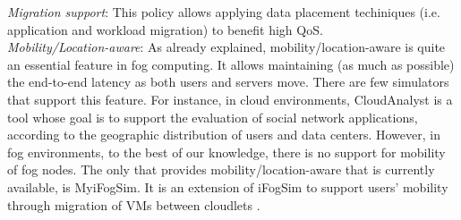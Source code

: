 \noindent\tab \textit{Migration support}: This policy allows applying data placement techiniques (i.e. application and workload migration) to benefit high QoS.\\
\noindent\tab \textit{Mobility/Location-aware}: As already explained, mobility/location-aware is quite an essential feature in fog computing. It allows maintaining (as much as possible) the end-to-end latency as both users and servers move. There are few simulators that support this feature. For instance, in cloud environments, CloudAnalyst \cite{wickremasinghe2010cloudanalyst} is a tool whose goal is to support the evaluation of social network applications, according to the geographic distribution of users and data centers. However, in fog environments, to the best of our knowledge, there is no support for mobility of fog nodes. The only that provides mobility/location-aware that is currently available, is MyiFogSim. It is an extension of iFogSim to support users' mobility through migration of VMs between cloudlets \cite{lopes2017myifogsim}.\\

